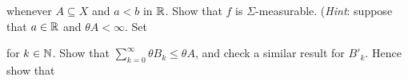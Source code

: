 {
     
\noindent whenever $A\subseteq X$ and $a<b$ in $\Bbb R$.   Show that $f$
is $\Sigma$-measurable.   ({\it Hint\/}: suppose that $a\in\Bbb R$ and
$\theta A<\infty$.   Set
     
     
     
\noindent for $k\in\Bbb N$.   Show that 
$\sum_{k=0}^{\infty}\theta B_k\le\theta A$, 
and check a similar result for $B'_k$.   Hence show that
     
}%
     
